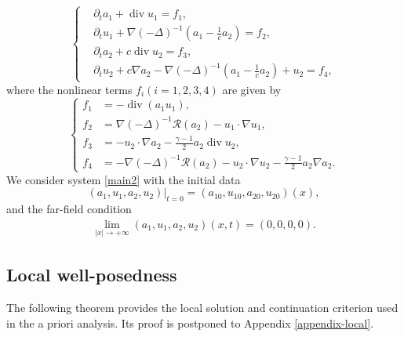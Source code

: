 \documentclass[10pt,reqno]{amsart}
\numberwithin{equation}{section}
\begin{document}
\begin{equation}\label{main2}
\left\{
\begin{aligned}
&\partial_t a_1+\operatorname{div}u_1=f_1,\\
&\partial_tu_1+\nabla(-\Delta)^{-1}\left(a_1-\frac1c a_2\right)=f_2,\\
&\partial_t a_2+c\operatorname{div}u_2=f_3,\\
&\partial_t u_2+c\nabla a_2-\nabla(-\Delta)^{-1}\left(a_1-\frac1c a_2\right)+u_2=f_4,
\end{aligned}
\right.
\end{equation}
where the nonlinear terms $f_i(i=1,2,3,4)$ are given by
\[ 
\left\{
\begin{aligned}
f_1&=-\operatorname{div}(a_1u_1),\\
f_2&=\nabla(-\Delta)^{-1}\mathcal R(a_2)-u_1\cdot\nabla u_1,\\
f_3&=-u_2\cdot\nabla a_2-\frac{\gamma-1}{2}a_2\operatorname{div}u_2,\\
f_4&=-\nabla(-\Delta)^{-1}\mathcal R(a_2)-u_2\cdot\nabla u_2
-\frac{\gamma-1}{2}a_2\nabla a_2.
\end{aligned}
\right.
\] 
We consider system \eqref{main2} with the initial data
\[ 
	(a_1,u_1,a_2,u_2)|_{t=0}=(a_{10},u_{10},a_{20},u_{20})(x),
\] 
and the far-field condition
\begin{align}\label{fd}
	\lim_{|x|\rightarrow +\infty}(a_1,u_1,a_2,u_2)(x,t)=(0,0,0,0).
\end{align}	

 

%
%
%
%
%
%

\subsection{Local well-posedness} 
The following theorem provides the local solution and continuation criterion used in the a priori analysis. Its proof is postponed to Appendix \ref{appendix-local}.
\end{document}
